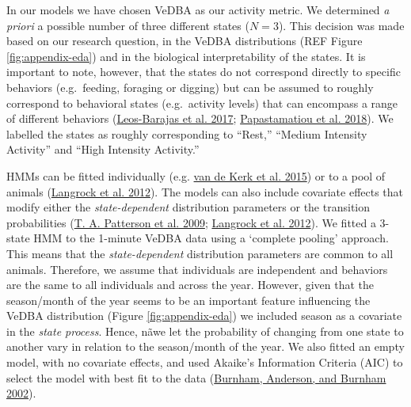\documentclass[english,msc,numbers,hidelinks]{coppe}
\begin{document}
  In our models we have chosen VeDBA as our activity metric. We determined \emph{a priori} a possible number of three different states (\(N=3\)). This decision was made based on our research question, in the VeDBA distributions (REF Figure \ref{fig:appendix-eda}) and in the biological interpretability of the states. It is important to note, however, that the states do not correspond directly to specific behaviors (e.g.~feeding, foraging or digging) but can be assumed to roughly correspond to behavioral states (e.g.~activity levels) that can encompass a range of different behaviors (\protect\hyperlink{ref-leosbarajas2017}{Leos-Barajas et al. 2017}; \protect\hyperlink{ref-papastamatiou2018}{Papastamatiou et al. 2018}). We labelled the states as roughly corresponding to ``Rest,'' ``Medium Intensity Activity'' and ``High Intensity Activity.''

  HMMs can be fitted individually (e.g. \protect\hyperlink{ref-vandekerk2015}{van de Kerk et al. 2015}) or to a pool of animals (\protect\hyperlink{ref-langrock2012}{Langrock et al. 2012}). The models can also include covariate effects that modify either the \emph{state-dependent} distribution parameters or the transition probabilities (\protect\hyperlink{ref-patterson2009}{T. A. Patterson et al. 2009}; \protect\hyperlink{ref-langrock2012}{Langrock et al. 2012}). We fitted a 3-state HMM to the 1-minute VeDBA data using a `complete pooling' approach. This means that the \emph{state-dependent} distribution parameters are common to all animals. Therefore, we assume that individuals are independent and behaviors are the same to all individuals and across the year. However, given that the season/month of the year seems to be an important feature influencing the VeDBA distribution (Figure \ref{fig:appendix-eda}) we included season as a covariate in the \emph{state process}. Hence, nãwe let the probability of changing from one state to another vary in relation to the season/month of the year. We also fitted an empty model, with no covariate effects, and used Akaike's Information Criteria (AIC) to select the model with best fit to the data (\protect\hyperlink{ref-burnham2002}{Burnham, Anderson, and Burnham 2002}).
\end{document}
